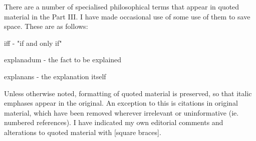 There are a number of specialised philosophical terms that appear in quoted material in the Part III. I have made occasional use of some use of them to save space. These are as follows:

iff - "if and only if"

explanadum - the fact to be explained

explanans - the explanation itself 

Unless otherwise noted, formatting of quoted material is preserved, so that italic emphases appear in the original. An exception to this is citations in original material, which have been removed wherever irrelevant or uninformative (ie. numbered references). I have indicated my own editorial comments and alterations to quoted material with [square braces].